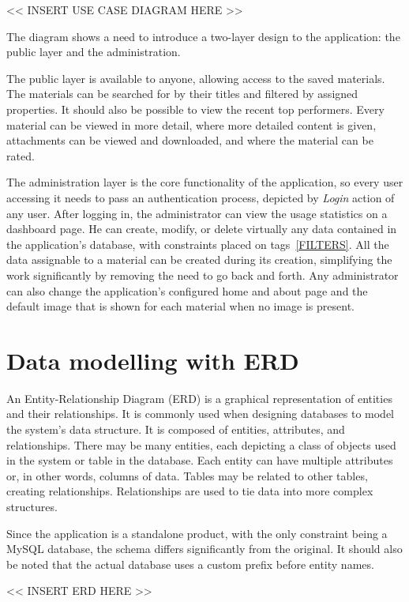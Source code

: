 \documentclass[
  digital,     %
  oneside,     %
  nosansbold,  %
  colorbold, %
  lof,         %
  lot,         %
]{fithesis4}
\begin{document}
<< INSERT USE CASE DIAGRAM HERE >>

The diagram shows a need to introduce a two-layer design to the application: the public layer and the administration.

The public layer is available to anyone, allowing access to the saved materials. The materials can be searched for by their titles and filtered by assigned properties. It should also be possible to view the recent top performers. Every material can be viewed in more detail, where more detailed content is given, attachments can be viewed and downloaded, and where the material can be rated.

The administration layer is the core functionality of the application, so every user accessing it needs to pass an authentication process, depicted by \textit{Login} action of any user. After logging in, the administrator can view the usage statistics on a dashboard page. He can create, modify, or delete virtually any data contained in the application's database, with constraints placed on tags~\ref{FILTERS}. All the data assignable to a material can be created during its creation, simplifying the work significantly by removing the need to go back and forth. Any administrator can also change the application's configured home and about page and the default image that is shown for each material when no image is present.

\section{Data modelling with ERD}

An Entity-Relationship Diagram (ERD) is a graphical representation of entities and their relationships. It is commonly used when designing databases to model the system's data structure. It is composed of entities, attributes, and relationships. There may be many entities, each depicting a class of objects used in the system or table in the database. Each entity can have multiple attributes or, in other words, columns of data. Tables may be related to other tables, creating relationships. Relationships are used to tie data into more complex structures.

Since the application is a standalone product, with the only constraint being a MySQL database, the schema differs significantly from the original. It should also be noted that the actual database uses a custom prefix before entity names.

<< INSERT ERD HERE >>
\end{document}
